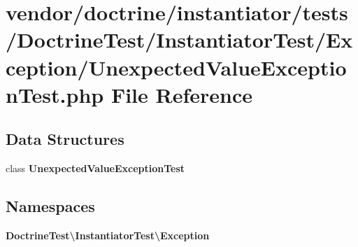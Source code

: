 \section{vendor/doctrine/instantiator/tests/\+Doctrine\+Test/\+Instantiator\+Test/\+Exception/\+Unexpected\+Value\+Exception\+Test.php File Reference}
\label{_unexpected_value_exception_test_8php}
\subsection*{Data Structures}
\begin{DoxyCompactItemize}
\item 
class {\bf Unexpected\+Value\+Exception\+Test}
\end{DoxyCompactItemize}
\subsection*{Namespaces}
\begin{DoxyCompactItemize}
\item 
 {\bf Doctrine\+Test\textbackslash{}\+Instantiator\+Test\textbackslash{}\+Exception}
\end{DoxyCompactItemize}
